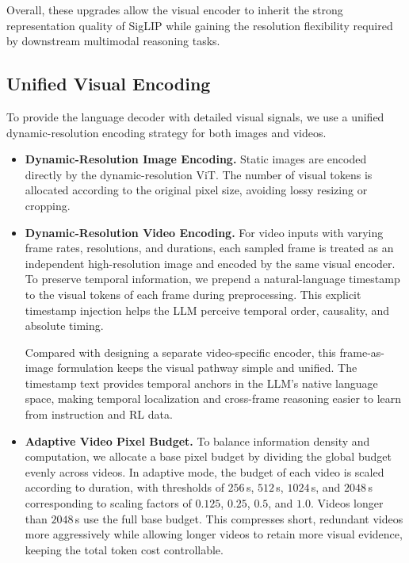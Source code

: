 \documentclass{article} %
\begin{document}
Overall, these upgrades allow the visual encoder to inherit the strong representation quality of SigLIP while gaining the resolution flexibility required by downstream multimodal reasoning tasks.

\subsection{Unified Visual Encoding}

To provide the language decoder with detailed visual signals, we use a unified dynamic-resolution encoding strategy for both images and videos.

\begin{itemize}
    \item \textbf{Dynamic-Resolution Image Encoding.}
    Static images are encoded directly by the dynamic-resolution ViT. The number of visual tokens is allocated according to the original pixel size, avoiding lossy resizing or cropping.

    \item \textbf{Dynamic-Resolution Video Encoding.}
    For video inputs with varying frame rates, resolutions, and durations, each sampled frame is treated as an independent high-resolution image and encoded by the same visual encoder. To preserve temporal information, we prepend a natural-language timestamp to the visual tokens of each frame during preprocessing. This explicit timestamp injection helps the LLM perceive temporal order, causality, and absolute timing.

    Compared with designing a separate video-specific encoder, this frame-as-image formulation keeps the visual pathway simple and unified. The timestamp text provides temporal anchors in the LLM's native language space, making temporal localization and cross-frame reasoning easier to learn from instruction and RL data.

    \item \textbf{Adaptive Video Pixel Budget.}
    To balance information density and computation, we allocate a base pixel budget by dividing the global budget evenly across videos. In adaptive mode, the budget of each video is scaled according to duration, with thresholds of $256$\,s, $512$\,s, $1024$\,s, and $2048$\,s corresponding to scaling factors of $0.125$, $0.25$, $0.5$, and $1.0$. Videos longer than $2048$\,s use the full base budget. This compresses short, redundant videos more aggressively while allowing longer videos to retain more visual evidence, keeping the total token cost controllable.
\end{itemize}
\end{document}
